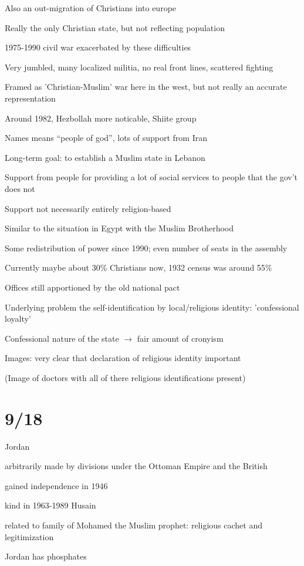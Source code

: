 \documentclass[12pt]{article}
\begin{document}
Also an out-migration of Christians into europe

Really the only Christian state, but not reflecting population

1975-1990 civil war exacerbated by these difficulties

Very jumbled, many localized militia, no real front lines, scattered fighting

Framed as 'Christian-Muslim' war here in the west, but not really an accurate representation

Around 1982, Hezbollah more noticable, Shiite group

Names means ``people of god'', lots of support from Iran

Long-term goal: to establish a Muslim state in Lebanon

Support from people for providing a lot of social services to people that the gov't does not

Support not necessarily entirely religion-based

Similar to the situation in Egypt with the Muslim Brotherhood

Some redistribution of power since 1990; even number of seats in the assembly

Currently maybe about 30\% Christians now, 1932 census was around 55\%

Offices still apportioned by the old national pact

Underlying problem the self-identification by local/religious identity: 'confessional loyalty'

Confessional nature of the state $\to$ fair amount of cronyism

Images: very clear that declaration of religious identity important

(Image of doctors with all of there religious identifications present)

\section{9/18}

Jordan

arbitrarily made by divisions under the Ottoman Empire and the British

gained independence in 1946

kind in 1963-1989 Husain

related to family of Mohamed the Muslim prophet: religious cachet and legitimization

Jordan has phosphates
\end{document}

